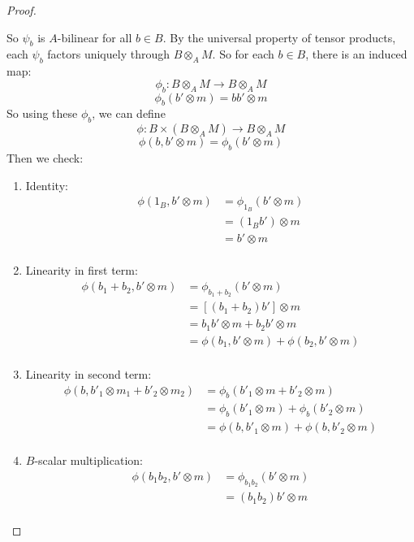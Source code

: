 \documentclass[hidelinks,12pt]{article}
\begin{document}
\begin{enumerate}[label=(\alph*).]
\begin{proof}
\begin{enumerate}[label=(\roman*).]
\end{enumerate}
So \(\psi_{b}\) is \(A\)-bilinear for all \(b\in B\). By the universal property of tensor products, each \(\psi_{b}\) factors uniquely through \(B\otimes_{A}M\). So for each \(b\in B\), there is an induced map:
\[
\phi_{b}:B\otimes_{A}M\to B\otimes_{A}M
\]
\[
\phi_{b}(b'\otimes m)=bb'\otimes m
\]
So using these \(\phi_{b}\), we can define \[
\phi:B\times(B\otimes_{A}M)\to B\otimes_{A}M
\]
\[
\phi(b,b'\otimes m)=\phi_{b}(b'\otimes m)
\]
Then we check:
\begin{enumerate}[label=(\roman*).]
    \item Identity: \begin{align*}
            \phi(1_{B},b'\otimes m)&=\phi_{1_{B}}(b'\otimes m)\\
                                   &=(1_{B}b')\otimes m\\
                                   &=b'\otimes m\\
    \end{align*}
    \item Linearity in first term:
        \begin{align*}
        \phi(b_{1}+b_{2},b'\otimes m)&=\phi_{b_{1}+b_{2}}(b'\otimes m)\\
                                     &=\left[(b_{1}+b_{2})b'\right]\otimes m\\
                                     &=b_{1}b'\otimes m+b_{2}b'\otimes m\\
                                     &=\phi(b_{1},b'\otimes m)+\phi(b_{2},b'\otimes m)\\
        \end{align*}
    \item Linearity in second term:
        \begin{align*}
            \phi(b,b'_{1}\otimes m_{1}+b'_{2}\otimes m_{2})&=\phi_{b}(b'_{1}\otimes m+b'_{2}\otimes m)\\
        &=\phi_{b}(b'_{1}\otimes m)+\phi_{b}(b'_{2}\otimes m)\\
        &=\phi(b,b'_{1}\otimes m)+\phi(b,b'_{2}\otimes m)\\
        \end{align*}
    \item \(B\)-scalar multiplication:
        \begin{align*}
        \phi(b_{1}b_{2},b'\otimes m)&=\phi_{b_{1}b_{2}}(b'\otimes m)\\
        &=(b_{1}b_{2})b'\otimes m\\

\end{align*}
\end{enumerate}
\end{proof}
\end{enumerate}
\end{document}
